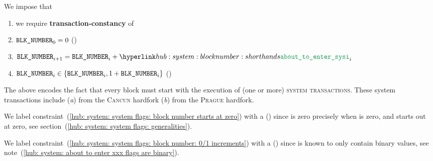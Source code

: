 We impose that
\begin{enumerate}
	\item we require \textbf{transaction-constancy} of \blockNumber{}
	\item \label{hub: system: system flags: block number starts at zero} $\texttt{BLK\_NUMBER} _{0} = 0$ (\sanityCheck)
	\item $\blockNumber _{i + 1} = \blockNumber _{i} + \aboutToEnterSystemInit _{i}$
	\item \label{hub: system: system flags: block number: 0/1 increments} $\texttt{BLK\_NUMBER} _{i} \in \{ \texttt{BLK\_NUMBER} _{i}, 1 + \texttt{BLK\_NUMBER} _{i} \}$ (\sanityCheck)
\end{enumerate}
\saNote{} \label{hub: system: system flags: block number increments and initial system transactions}
The above encodes the fact that every block must start with the execution of (one or more) \textsc{system transactions}.
These system transactions include
(\emph{a}) \cite{EIP-4788} from the \textsc{Cancun} hardfork
(\emph{b}) \cite{EIP-2935} from the \textsc{Prague} hardfork.

\saNote{}
We label constraint~(\ref {hub: system: system flags: block number starts at zero}) with a (\sanityCheck) since
\blockNumber{} is zero precisely when \flagSum{} is zero, and
\flagSum{} starts out at zero,
see section~(\ref{hub: system: system flags: generalities}).

\saNote{}
We label constraint~(\ref{hub: system: system flags: block number: 0/1 increments}) with a (\sanityCheck) since
\aboutToEnterSystemInit{} is known to only contain binary values,
see note~(\ref{hub: system: about to enter xxx flags are binary}).

